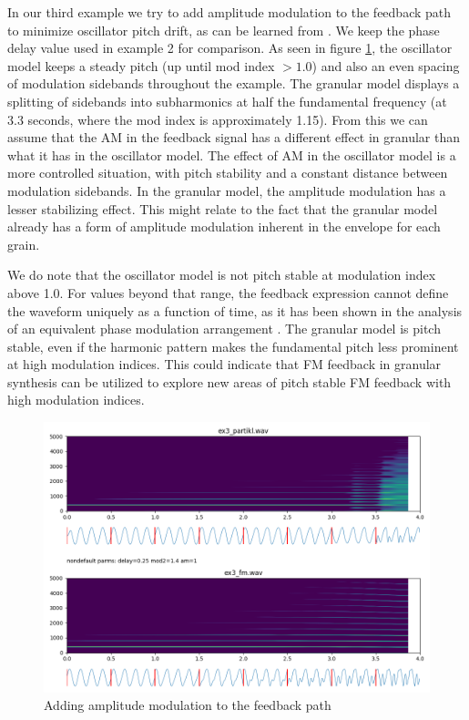 \documentclass[runningheads,a4paper]{llncs}
\begin{document}
In our third example we try to add amplitude modulation to the feedback path to minimize oscillator pitch drift, as can be learned from \cite{Lazzarini-2024}. We keep the phase delay value used in example 2 for comparison. As seen in figure \ref{fig:ex3}, the oscillator model keeps a steady pitch (up until mod index $> 1.0$) and also an even spacing of modulation sidebands throughout the example. The granular model displays a splitting of sidebands into subharmonics at half the fundamental frequency (at 3.3 seconds, where the mod index is approximately 1.15). From this we can assume that the AM in the feedback signal has a different effect in granular than what it has in the oscillator model. The effect of AM in the oscillator model is a more controlled situation, with pitch stability and a constant distance between modulation sidebands. In the granular model, the amplitude modulation has a lesser stabilizing effect. This might relate to the fact that the granular model already has a form of amplitude modulation inherent in the envelope for each grain.

We do note that the oscillator model is not pitch stable at modulation index above 1.0. For values beyond that range, the feedback expression cannot define the waveform uniquely as a function of time, as it has been shown in the analysis of an equivalent phase modulation arrangement \cite[p.61]{Benson}.
The granular model is pitch stable, even if the harmonic pattern makes the fundamental pitch less prominent at high modulation indices. This could indicate that FM feedback in granular synthesis can be utilized to explore new areas of pitch stable FM feedback with high modulation indices.

\begin{figure}[h]
	\centering
	\includegraphics[width=.95\textwidth]{ex3_compare.png}
	\caption{Adding amplitude modulation to the feedback path}
	\label{fig:ex3}
\end{figure}
\end{document}
